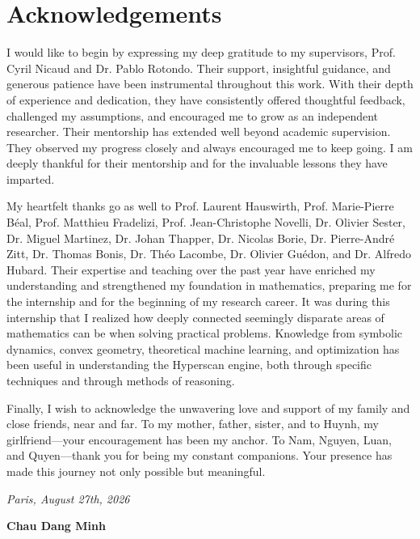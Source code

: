 \chapter*{Acknowledgements}

I would like to begin by expressing my deep gratitude to my supervisors, Prof. Cyril Nicaud and Dr. Pablo Rotondo. Their support, insightful guidance, and generous patience have been instrumental throughout this work. With their depth of experience and dedication, they have consistently offered thoughtful feedback, challenged my assumptions, and encouraged me to grow as an independent researcher. Their mentorship has extended well beyond academic supervision. They observed my progress closely and always encouraged me to keep going. I am deeply thankful for their mentorship and for the invaluable lessons they have imparted.

My heartfelt thanks go as well to Prof. Laurent Hauswirth, Prof. Marie-Pierre Béal, Prof. Matthieu Fradelizi, Prof. Jean-Christophe Novelli, Dr. Olivier Sester, Dr. Miguel Martinez, Dr. Johan Thapper, Dr. Nicolas Borie, Dr. Pierre-André Zitt, Dr. Thomas Bonis, Dr. Théo Lacombe, Dr. Olivier Guédon, and Dr. Alfredo Hubard. Their expertise and teaching over the past year have enriched my understanding and strengthened my foundation in mathematics, preparing me for the internship and for the beginning of my research career. It was during this internship that I realized how deeply connected seemingly disparate areas of mathematics can be when solving practical problems. Knowledge from symbolic dynamics, convex geometry, theoretical machine learning, and optimization has been useful in understanding the Hyperscan engine, both through specific techniques and through methods of reasoning.

Finally, I wish to acknowledge the unwavering love and support of my family and close friends, near and far. To my mother, father, sister, and to Huynh, my girlfriend---your encouragement has been my anchor. To Nam, Nguyen, Luan, and Quyen---thank you for being my constant companions. Your presence has made this journey not only possible but meaningful.

\textit{Paris, August 27th, 2026}

\textbf{Chau Dang Minh}
